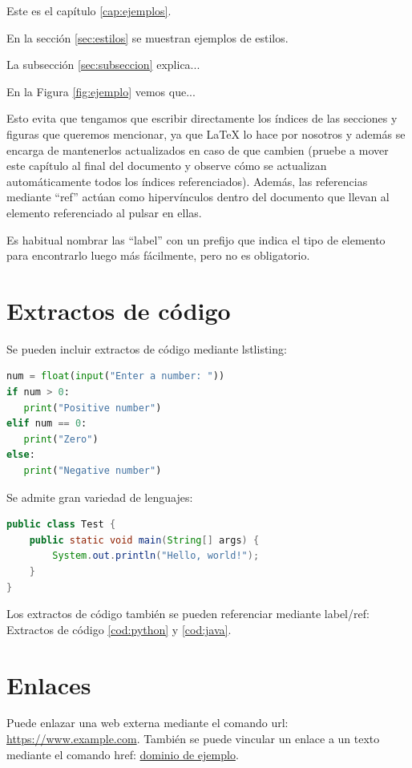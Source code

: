 Este es el capítulo \ref{cap:ejemplos}.

En la sección \ref{sec:estilos} se muestran ejemplos de estilos.

La subsección \ref{sec:subseccion} explica...

En la Figura \ref{fig:ejemplo} vemos que...

Esto evita que tengamos que escribir directamente los índices de las secciones y figuras que queremos mencionar, ya que LaTeX lo hace por nosotros y además se encarga de mantenerlos actualizados en caso de que cambien (pruebe a mover este capítulo al final del documento y observe cómo se actualizan automáticamente todos los índices referenciados). Además, las referencias mediante ``ref'' actúan como hipervínculos dentro del documento que llevan al elemento referenciado al pulsar en ellas.

Es habitual nombrar las ``label'' con un prefijo que indica el tipo de elemento para encontrarlo luego más fácilmente, pero no es obligatorio.

\section{Extractos de código}

Se pueden incluir extractos de código mediante lstlisting:

\begin{lstlisting}[language=Python, caption={Código Python}, label={cod:python}, captionpos=b]
num = float(input("Enter a number: "))
if num > 0:
   print("Positive number")
elif num == 0:
   print("Zero")
else:
   print("Negative number")
\end{lstlisting}

Se admite gran variedad de lenguajes:

\begin{lstlisting}[language=Java, caption={Código Java}, label={cod:java}, captionpos=b]
public class Test {
    public static void main(String[] args) {
        System.out.println("Hello, world!");
    }
}
\end{lstlisting}

Los extractos de código también se pueden referenciar mediante label/ref: Extractos de código \ref{cod:python} y \ref{cod:java}.

\section{Enlaces}
Puede enlazar una web externa mediante el comando url: \url{https://www.example.com}. También se puede vincular un enlace a un texto mediante el comando href: \href{https://www.example.com}{dominio de ejemplo}.

